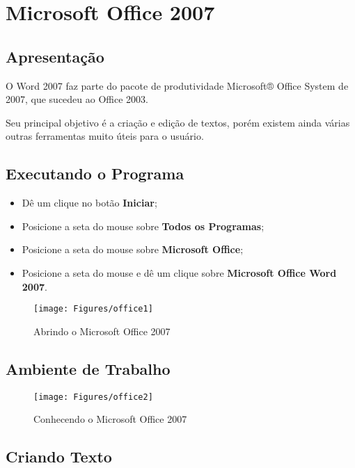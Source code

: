 \documentclass[hidelinks,12pt]{article}
\begin{document}
	\section{Microsoft Office 2007}

	\subsection{Apresentação}

	O Word 2007 faz parte do pacote de produtividade Microsoft® Office System de 2007, que sucedeu ao Office 2003.

	Seu principal objetivo é a criação e edição de textos, porém existem ainda várias outras ferramentas muito úteis para o usuário.

	\subsection{Executando o Programa}

	\begin{itemize}
		\item Dê um clique no botão \textbf {Iniciar};

		\item Posicione a seta do mouse sobre \textbf{Todos os Programas};

		\item Posicione a seta do mouse sobre \textbf{Microsoft Office};

		\item Posicione a seta do mouse e dê um clique sobre \textbf{Microsoft Office Word 2007}.


	\end{itemize}

	\begin{figure}[!h]
		\centering
		\texttt{[image: Figures/office1]}
		\label{fig:office1}
		\caption{Abrindo o Microsoft Office 2007}
	\end{figure}

	\newpage
	\subsection{Ambiente de Trabalho}

		\begin{figure}[!h]
			\centering
			\texttt{[image: Figures/office2]}
			\label{fig:office2}
			\caption{Conhecendo o Microsoft Office 2007}
		\end{figure}

	\subsection{Criando Texto}
\end{document}
